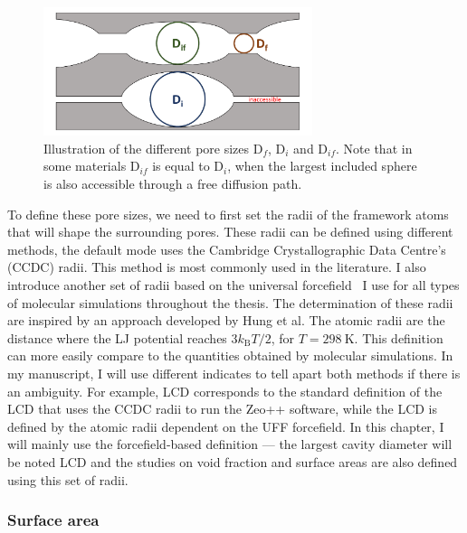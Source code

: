 \documentclass[main.tex]{subfiles}
\begin{document}
\begin{figure}[ht]
  \centering
  \includegraphics[width=0.7\textwidth]{figures/2-thermo/pores.pdf}
  \caption{Illustration of the different pore sizes D$_f$, D$_i$ and D$_{if}$. Note that in some materials D$_{if}$ is equal to D$_i$, when the largest included sphere is also accessible through a free diffusion path. }\label{fgr:pore_size}
\end{figure}

To define these pore sizes, we need to first set the radii of the framework atoms that will shape the surrounding pores. These radii can be defined using different methods, the default mode uses the Cambridge Crystallographic Data Centre's (CCDC) radii. This method is most commonly used in the literature. I also introduce another set of radii based on the universal forcefield~\autocite{rappe1992} I use for all types of molecular simulations throughout the thesis. The determination of these radii are inspired by an approach developed by Hung et al.\autocite{Hung_2021} The atomic radii are the distance where the LJ potential reaches $3 k_\text{B} T/2$, for $T = \SI{298}{\kelvin}$. This  definition can  more easily compare to the quantities obtained by molecular simulations. In my manuscript, I will use different indicates to tell apart both methods if there is an ambiguity. For example, LCD corresponds to the standard definition of the LCD that uses the CCDC radii to run the Zeo++ software, while the LCD is defined by the atomic radii dependent on the UFF forcefield. In this chapter, I will mainly use the forcefield-based definition --- the largest cavity diameter will be noted LCD and the studies on void fraction and surface areas are also defined using this set of radii.


\subsubsection{Surface area}
\end{document}

